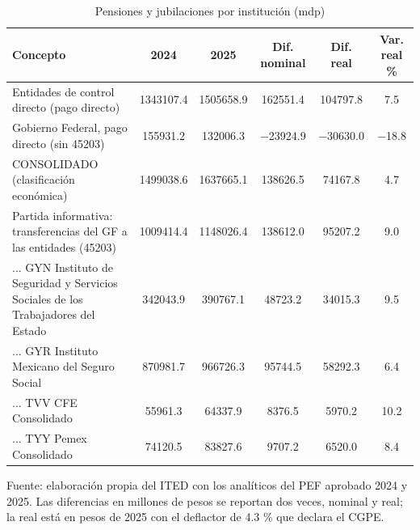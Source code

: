 \begin{table}[htbp]
\centering
\caption{Pensiones y jubilaciones por institución (mdp)}
\label{tab:C5_1}
\footnotesize
\setlength{\tabcolsep}{4pt}
\begin{tabular}{L{4.2cm}SSSSS}
\toprule
{Concepto} & {2024} & {2025} & {Dif. nominal} & {Dif. real} & {Var. real \%} \\
\midrule
{Entidades de control directo (pago directo)} & \num{1343107.4} & \num{1505658.9} & \num{162551.4} & \num{104797.8} & \num{7.5} \\
{Gobierno Federal, pago directo (sin 45203)} & \num{155931.2} & \num{132006.3} & \num{-23924.9} & \num{-30630.0} & \num{-18.8} \\
{CONSOLIDADO (clasificación económica)} & \num{1499038.6} & \num{1637665.1} & \num{138626.5} & \num{74167.8} & \num{4.7} \\
{Partida informativa: transferencias del GF a las entidades (45203)} & \num{1009414.4} & \num{1148026.4} & \num{138612.0} & \num{95207.2} & \num{9.0} \\
{... GYN Instituto de Seguridad y Servicios Sociales de los Trabajadores del Estado} & \num{342043.9} & \num{390767.1} & \num{48723.2} & \num{34015.3} & \num{9.5} \\
{... GYR Instituto Mexicano del Seguro Social} & \num{870981.7} & \num{966726.3} & \num{95744.5} & \num{58292.3} & \num{6.4} \\
{... TVV CFE Consolidado} & \num{55961.3} & \num{64337.9} & \num{8376.5} & \num{5970.2} & \num{10.2} \\
{... TYY Pemex Consolidado} & \num{74120.5} & \num{83827.6} & \num{9707.2} & \num{6520.0} & \num{8.4} \\
\bottomrule
\end{tabular}
\par\vspace{2pt}\footnotesize Fuente: elaboración propia del ITED con los analíticos del PEF aprobado 2024 y 2025. Las diferencias en millones de pesos se reportan dos veces, nominal y real; la real está en pesos de 2025 con el deflactor de 4.3 \% que declara el CGPE.
\end{table}
